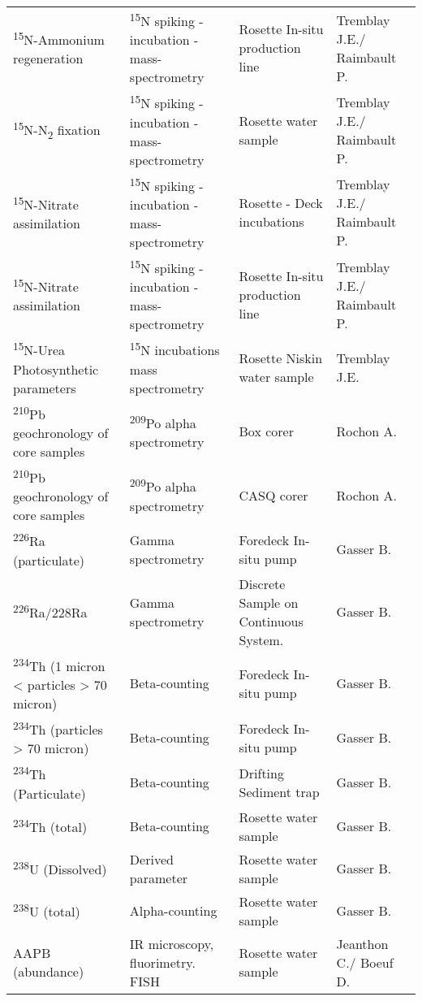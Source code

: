 \begin{longtable}[t]{llll}
\addlinespace
\textsuperscript{15}N-Ammonium regeneration & \textsuperscript{15}N spiking - incubation - mass-spectrometry & Rosette In-situ production line & Tremblay J.E./ Raimbault P.\\
\textsuperscript{15}N-N\textsubscript{2} fixation & \textsuperscript{15}N spiking - incubation - mass-spectrometry & Rosette water sample & Tremblay J.E./ Raimbault P.\\
\textsuperscript{15}N-Nitrate assimilation & \textsuperscript{15}N spiking - incubation - mass-spectrometry & Rosette - Deck incubations & Tremblay J.E./ Raimbault P.\\
\textsuperscript{15}N-Nitrate assimilation & \textsuperscript{15}N spiking - incubation - mass-spectrometry & Rosette In-situ production line & Tremblay J.E./ Raimbault P.\\
\textsuperscript{15}N-Urea Photosynthetic parameters & \textsuperscript{15}N incubations mass spectrometry & Rosette Niskin water sample & Tremblay J.E.\\
\addlinespace
\textsuperscript{210}Pb geochronology of core samples & \textsuperscript{209}Po alpha spectrometry & Box corer & Rochon A.\\
\textsuperscript{210}Pb geochronology of core samples & \textsuperscript{209}Po alpha spectrometry & CASQ corer & Rochon A.\\
\textsuperscript{226}Ra (particulate) & Gamma spectrometry & Foredeck In-situ pump & Gasser B.\\
\textsuperscript{226}Ra/228Ra & Gamma spectrometry & Discrete Sample on Continuous System. & Gasser B.\\
\textsuperscript{234}Th (1 micron < particles > 70 micron) & Beta-counting & Foredeck In-situ pump & Gasser B.\\
\addlinespace
\textsuperscript{234}Th (particles > 70 micron) & Beta-counting & Foredeck In-situ pump & Gasser B.\\
\textsuperscript{234}Th (Particulate) & Beta-counting & Drifting Sediment trap & Gasser B.\\
\textsuperscript{234}Th (total) & Beta-counting & Rosette water sample & Gasser B.\\
\textsuperscript{238}U (Dissolved) & Derived parameter & Rosette water sample & Gasser B.\\
\textsuperscript{238}U (total) & Alpha-counting & Rosette water sample & Gasser B.\\
\addlinespace
AAPB (abundance) & IR microscopy, fluorimetry. FISH & Rosette water sample & Jeanthon C./ Boeuf D.\\

\end{longtable}
